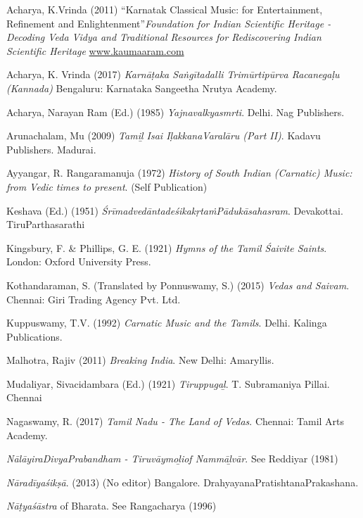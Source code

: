 \begin{thebibliography}{99}
 Acharya, K.Vrinda (2011) “Karnatak Classical Music: for Entertainment, Refinement and Enlightenment”\textit{Foundation for Indian Scientific Heritage - Decoding Veda Vidya and Traditional Resources for Rediscovering Indian Scientific Heritage} \url{www.kaumaaram.com}

  Acharya, K. Vrinda (2017) \textit{Karnāṭaka Saṅgītadalli Trimūrtipūrva Racanegaḷu (Kannada)} Bengaluru: Karnataka Sangeetha Nrutya Academy.

  Acharya, Narayan Ram (Ed.) (1985) \textit{Yajnavalkyasmrti}. Delhi. Nag Publishers.

  Arunachalam, Mu (2009) \textit{Tamiḻ Isai IḷakkanaVaralāru (Part II)}. Kadavu Publishers. Madurai.

  Ayyangar, R. Rangaramanuja (1972) \textit{History of South Indian (Carnatic) Music: from Vedic} \textit{times to present}. (Self Publication)

  Keshava (Ed.) (1951) \textit{ŚrīmadvedāntadeśikakṛtaṁPādukāsahasram}. Devakottai. TiruParthasarathi

  Kingsbury, F. \& Phillips, G. E. (1921) \textit{Hymns of the Tamil Śaivite Saints}. London: Oxford University Press.

  Kothandaraman, S. (Translated by Ponnuswamy, S.) (2015) \textit{Vedas and Saivam}. Chennai: Giri Trading Agency Pvt. Ltd.

  Kuppuswamy, T.V. (1992) \textit{Carnatic Music and the Tamils}. Delhi. Kalinga Publications.

  Malhotra, Rajiv (2011) \textit{Breaking India}. New Delhi: Amaryllis.

  Mudaliyar, Sivacidambara (Ed.) (1921) \textit{Tiruppugaḻ}. T. Subramaniya Pillai. Chennai

  Nagaswamy, R. (2017) \textit{Tamil Nadu - The Land of Vedas}. Chennai: Tamil Arts Academy.

  \textit{NālāyiraDivyaPrabandham - Tiruvāymoḻiof Nammāḻvār}. See Reddiyar (1981)

  \textit{Nāradīyaśikṣā}. (2013) (No editor) Bangalore. DrahyayanaPratishtanaPrakashana.

  \textit{Nāṭyaśāstra} of Bharata. See Rangacharya (1996)


\end{thebibliography}
